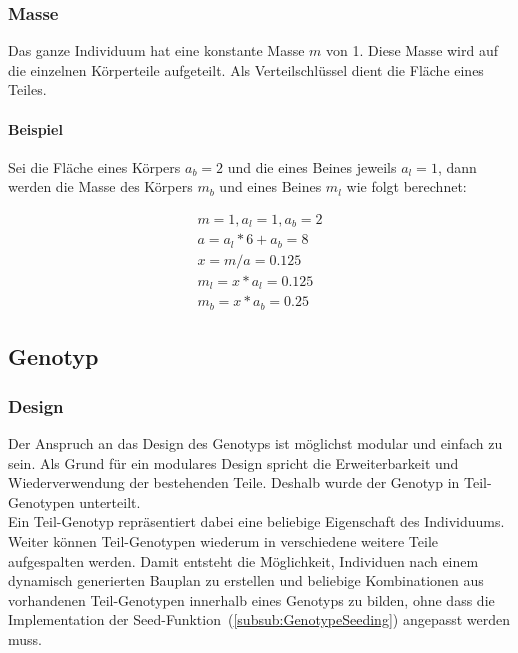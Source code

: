       \subsubsection{Masse\label{subsub:Mass}}

        Das ganze Individuum hat eine konstante Masse \(m\) von 1.
        Diese Masse wird auf die einzelnen Körperteile aufgeteilt.
        Als Verteilschlüssel dient die Fläche eines Teiles.

        \paragraph{Beispiel\label{par:MassExample}}

          Sei die Fläche eines Körpers \(a_{b} = 2 \) und die eines Beines jeweils \(a_{l} = 1\),
          dann werden die Masse des Körpers \(m_{b}\) und eines Beines \(m_{l}\) wie folgt berechnet:

          \begin{gather*}
            m = 1, a_{l} = 1, a_{b} = 2 \\
            a = a_{l} * 6 + a_{b} = 8 \\
            x = m / a = 0.125 \\
            m_{l} = x * a_{l} = 0.125 \\
            m_{b} = x * a_{b} = 0.25
          \end{gather*}

    \subsection{Genotyp\label{sub:Genotype}}

      \subsubsection{Design\label{subsub:GenotypeDesign}}

        Der Anspruch an das Design des Genotyps ist möglichst modular und einfach zu sein.
        Als Grund für ein modulares Design spricht die Erweiterbarkeit und Wiederverwendung der bestehenden Teile.
        Deshalb wurde der Genotyp in Teil-Genotypen unterteilt.
        \\
        Ein Teil-Genotyp repräsentiert dabei eine beliebige Eigenschaft des Individuums.
        Weiter können Teil-Genotypen wiederum in verschiedene weitere Teile aufgespalten werden.
        Damit entsteht die Möglichkeit, Individuen nach einem dynamisch generierten Bauplan zu erstellen
        und beliebige Kombinationen aus vorhandenen Teil-Genotypen innerhalb eines Genotyps zu bilden,
        ohne dass die Implementation der Seed-Funktion~(\vref{subsub:GenotypeSeeding}) angepasst werden muss.

